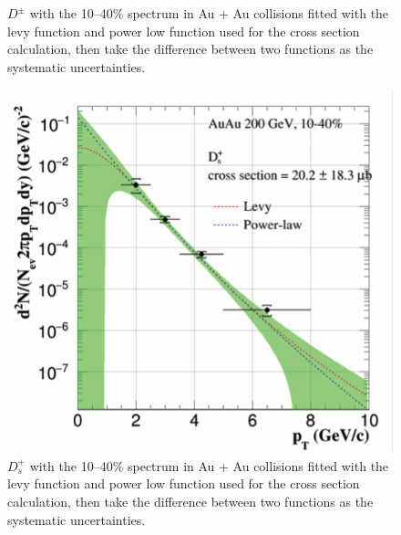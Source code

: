 \begin{figure}[htbp]
\begin{minipage}[htbp]{0.47\linewidth}
\caption{$D^{\pm}$ with the 10--40\% spectrum in Au + Au collisions fitted with the levy function and power low function used for the cross section calculation, then take the difference between two functions as the systematic uncertainties. \label{ccx_2}}
\end{minipage}
\end{figure}

\begin{figure}[htbp]
\begin{minipage}[htbp]{0.47\linewidth}
\centering
\includegraphics[width=1.0\textwidth,angle=0]{figure/Run14_D0HFT/ccx_3.png}
\caption{$D_{s}^{+}$ with the 10--40\% spectrum in Au + Au collisions fitted with the levy function and power low function used for the cross section calculation, then take the difference between two functions as the systematic uncertainties. \label{ccx_3}}
\end{minipage}
\hfill
\begin{minipage}[htbp]{0.47\linewidth}
\centering

\end{minipage}
\end{figure}
